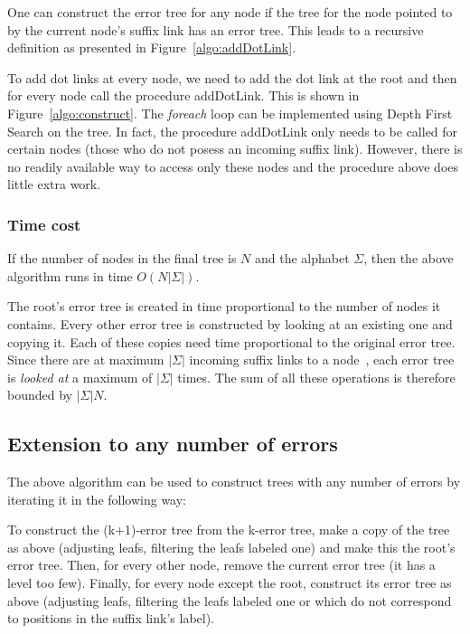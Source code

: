 \documentclass[a4paper,10pt]{article}
\begin{document}


One can construct the error tree for any node if the tree for the node pointed to by the current node's suffix link has an error tree. This leads to a recursive definition as presented in Figure~\ref{algo:addDotLink}. 



To add dot links at every node, we need to add the dot link at the root and then for every node call the procedure addDotLink. This is shown in Figure~\ref{algo:construct}. The \textit{foreach} loop can be implemented using Depth First Search on the tree. In fact, the procedure addDotLink only needs to be called for certain nodes (those who do not posess an incoming suffix link). However, there is no readily available way to access only these nodes and the procedure above does little extra work.

\subsubsection{Time cost}

If the number of nodes in the final tree is $N$ and the alphabet $\Sigma$, then the above algorithm runs in time $O(N|\Sigma|)$.

The root's error tree is created in time proportional to the number of nodes it contains. Every other error tree is constructed by looking at an existing one and copying it. Each of these copies need time proportional to the original error tree. Since there are at maximum $|\Sigma|$ incoming suffix links to a node~\cite{}, each error tree is \emph{looked at} a maximum of $|\Sigma|$ times. The sum of all these operations is therefore bounded by $|\Sigma|N$.

\subsection{Extension to any number of errors}

The above algorithm can be used to construct trees with any number of errors by iterating it in the following way:

To construct the (k+1)-error tree from the k-error tree, make a copy of the tree as above (adjusting leafs, filtering the leafs labeled one) and make this the root's error tree. Then, for every other node, remove the current error tree (it has a level too few). Finally, for every node except the root, construct its error tree as above (adjusting leafs, filtering the leafs labeled one or which do not correspond to positions in the suffix link's label).
\end{document}
